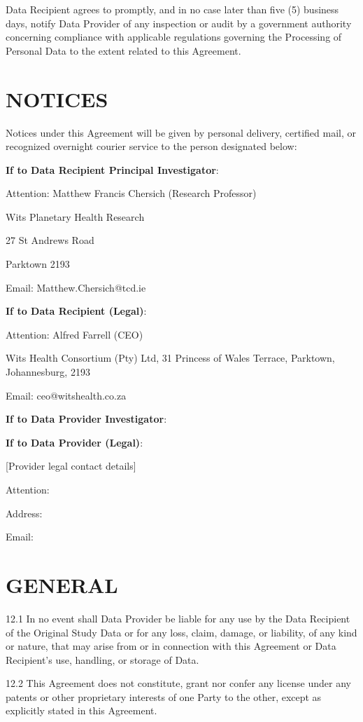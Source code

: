 {\begin{enumerate}
Data Recipient agrees to promptly, and in no case later than five (5) business days, notify Data Provider of any inspection or audit by a government authority concerning compliance with applicable regulations governing the Processing of Personal Data to the extent related to this Agreement.

\section{NOTICES}

Notices under this Agreement will be given by personal delivery, certified mail, or recognized overnight courier service to the person designated below:

\textbf{If to Data Recipient Principal Investigator}:

Attention: Matthew Francis Chersich (Research Professor)

Wits Planetary Health Research

27 St Andrews Road

Parktown 2193

Email: Matthew.Chersich@tcd.ie

\textbf{If to Data Recipient (Legal)}:

Attention: Alfred Farrell (CEO)

Wits Health Consortium (Pty) Ltd, 31 Princess of Wales Terrace, Parktown, Johannesburg, 2193

Email: ceo@witshealth.co.za

\textbf{If to Data Provider Investigator}:

\textbf{If to Data Provider (Legal)}:

[Provider legal contact details]

Attention:

Address:

Email:

\section{GENERAL}

12.1 In no event shall Data Provider be liable for any use by the Data Recipient of the Original Study Data or for any loss, claim, damage, or liability, of any kind or nature, that may arise from or in connection with this Agreement or Data Recipient's use, handling, or storage of Data.

12.2 This Agreement does not constitute, grant nor confer any license under any patents or other proprietary interests of one Party to the other, except as explicitly stated in this Agreement.


\end{enumerate}}
